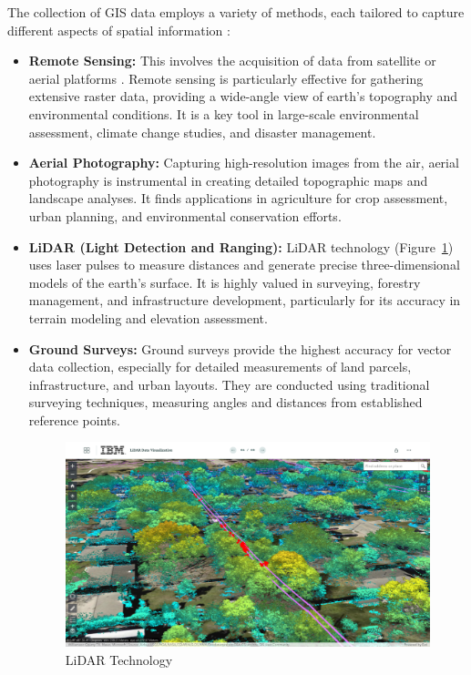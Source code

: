 \documentclass[10pt,oneside,english,a4paper]{article}
\begin{document}
The collection of GIS data employs a variety of methods, each tailored to capture different aspects of spatial information \cite{Demers2008}:

\begin{itemize}
\item \textbf{Remote Sensing:} This involves the acquisition of data from satellite or aerial platforms \cite{Novak1995}. Remote sensing is particularly effective for gathering extensive raster data, providing a wide-angle view of earth’s topography and environmental conditions. It is a key tool in large-scale environmental assessment, climate change studies, and disaster management.

\item \textbf{Aerial Photography:} Capturing high-resolution images from the air, aerial photography is instrumental in creating detailed topographic maps and landscape analyses. It finds applications in agriculture for crop assessment, urban planning, and environmental conservation efforts.

\item \textbf{LiDAR (Light Detection and Ranging):} LiDAR technology (Figure~\ref{fig:lidar}) uses laser pulses to measure distances and generate precise three-dimensional models of the earth's surface. It is highly valued in surveying, forestry management, and infrastructure development, particularly for its accuracy in terrain modeling and elevation assessment.

\item \textbf{Ground Surveys:} Ground surveys provide the highest accuracy for vector data collection, especially for detailed measurements of land parcels, infrastructure, and urban layouts. They are conducted using traditional surveying techniques, measuring angles and distances from established reference points.

\begin{figure}[h]
	\centering
	\includegraphics[scale = 0.2]{diagram9.png}
	\caption{LiDAR Technology}
	\label{fig:lidar}
\end{figure}

\end{itemize}
\end{document}
